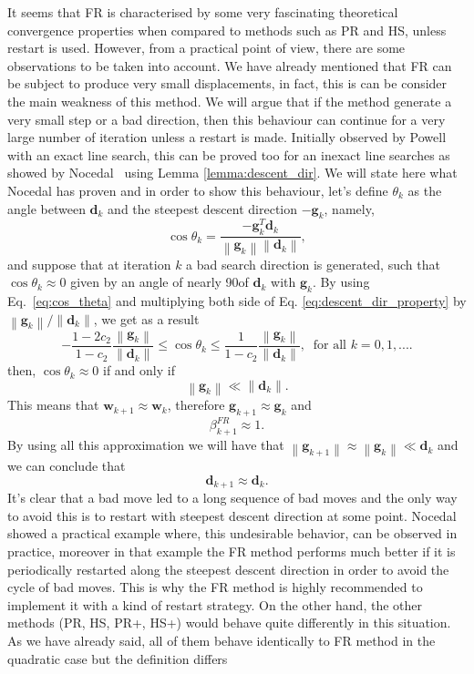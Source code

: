 \documentclass[11pt]{article}
\newcommand{\norm}[1]{\left\lVert#1\right\rVert}
\begin{document}
It seems that FR is characterised by some very fascinating theoretical convergence properties when compared to methods such as PR and HS, unless restart is used. However, from a practical point of view, there are some observations to be taken into account. We have already mentioned that FR can be subject to produce very small displacements, in fact, this is can be consider the main weakness of this method. We will argue that if the method generate a very small step or a bad direction, then this behaviour can continue for a very large number of iteration unless a restart is made. Initially observed by Powell~\cite{powell} with an exact line search, this can be proved too for an inexact line searches as showed by Nocedal~\cite{nocedal_global_convergence} using Lemma \ref{lemma:descent_dir}. We will state here what Nocedal has proven and in order to show this behaviour, let's define $\theta_k$ as the angle between $\mathbf{d}_k$ and the steepest descent direction $-\mathbf{g}_k$, namely,
\begin{equation}
    \label{eq:cos_theta}
    \cos \theta_k = \frac{-\mathbf{g}_k^T \mathbf{d}_k}{\norm{\mathbf{g}_k}\norm{\mathbf{d}_k}},
\end{equation}
and suppose that at iteration $k$ a bad search direction is generated, such that $\cos \theta_k \approx 0$ given by an angle of nearly 90\degree of $\mathbf{d}_k$ with $\mathbf{g}_k$. By using Eq.~\ref{eq:cos_theta} and multiplying both side of Eq. \ref{eq:descent_dir_property} by $ \norm{\mathbf{g}_k} / \norm{\mathbf{d}_k}$, we get as a result
\begin{equation}
    -\frac{1-2c_2}{1-c_2}\frac{\norm{\mathbf{g}_k}}{\norm{\mathbf{d}_k}} \leq \cos \theta_k \leq \frac{1}{1 -c_2} \frac{\norm{\mathbf{g}_k}}{\norm{\mathbf{d}_k}},\; \; \text{for all $k = 0,1, ....$}
\end{equation}
then, $\cos \theta_k \approx 0$ if and only if
$$ \norm{\mathbf{g}_k} \ll \norm{\mathbf{d}_k}.$$
This means that $\mathbf{w}_{k+1} \approx \mathbf{w}_k$, therefore $\mathbf{g}_{k+1} \approx \mathbf{g}_k$ and
$$ \beta^{FR}_{k+1} \approx 1.$$
By using all this approximation we will have that $\norm{\mathbf{g}_{k+1}} \approx \norm{\mathbf{g}_k} \ll \mathbf{d}_k$ and we can conclude that
$$ \mathbf{d}_{k+1} \approx \mathbf{d}_k.$$
It's clear that a bad move led to a long sequence of bad moves and the only way to avoid this is to restart with steepest descent direction at some point. Nocedal~\cite{nocedal_global_convergence} showed a practical example where, this undesirable behavior, can be observed in practice, moreover in that example the FR method performs much better if it is periodically restarted along the steepest descent direction in order to avoid the cycle of bad moves. This is why the FR method is highly recommended to implement it with a kind of restart strategy. On the other hand, the other methods (PR, HS, PR+, HS+) would behave quite differently in this situation. As we have already said, all of them behave identically to FR method in the quadratic case but the definition differs
\end{document}
